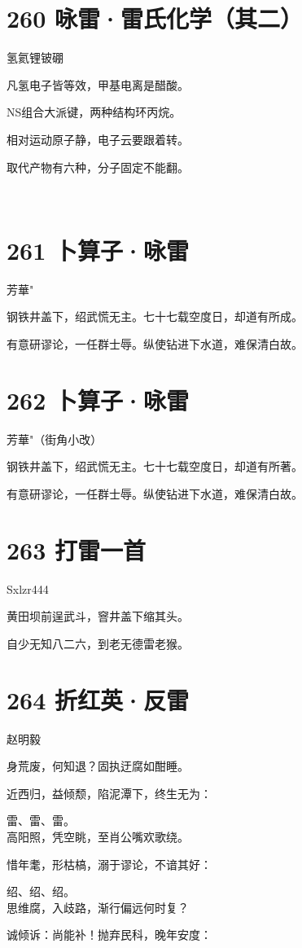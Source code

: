 \documentclass[UTF8,12pt,oneside]{ctexbook}
\def\pau#1{\begin{center} {#1} \end{center}} %
\def\poem#1#2{\section{#1}\pau{#2}} %
\def\lidl{\setlength\parindent{6em}}
\begin{document}
        \newpage

        \poem{260 咏雷·雷氏化学（其二）}{氢氦锂铍硼}
        \begin{center}
        凡氢电子皆等效，甲基电离是醋酸。

        NS组合大派键，两种结构环丙烷。
        
        相对运动原子静，电子云要跟着转。
        
        取代产物有六种，分子固定不能翻。

        ~\\
        \end{center}

        \poem{261 卜算子·咏雷}{芳華"}

        钢铁井盖下，绍武慌无主。七十七载空度日，却道有所成。

        有意研谬论，一任群士辱。纵使钻进下水道，难保清白故。
        ~\\

        \poem{262 卜算子·咏雷}{芳華"（街角小改）}

        钢铁井盖下，绍武慌无主。七十七载空度日，却道有所著。

        有意研谬论，一任群士辱。纵使钻进下水道，难保清白故。
        ~\\

        \newpage
        
        \poem{263 打雷一首}{Sxlzr444}
        \begin{center}
        黄田坝前逞武斗，窨井盖下缩其头。

        自少无知八二六，到老无德雷老猴。
        \end{center}

        \poem{264 折红英·反雷}{赵明毅}

        \lidl
        身荒废，何知退？固执迂腐如酣睡。
        
        近西归，益倾颓，陷泥潭下，终生无为：
        
        雷、雷、雷。
        ~\\

        高阳照，凭空眺，至肖公嘴欢歌绕。
        
        惜年耄，形枯槁，溺于谬论，不谙其好：
        
        绍、绍、绍。
        ~\\

        思维腐，入歧路，渐行偏远何时复？
        
        诚倾诉：尚能补！抛弃民科，晚年安度：
        
\end{document}
